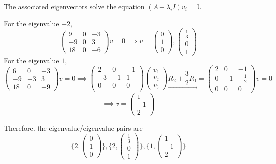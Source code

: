 \documentclass[11pt]{article}
\begin{document}
\begin{enumerate}
  The associated eigenvectors solve the equation $(A - \lambda_i I)v_i = 0$.
  
  For the eigenvalue $-2$, 
  \[\begin{pmatrix}
    9 & 0 & -3\\
    -9 & 0 & 3\\
     18 & 0 & -6
  \end{pmatrix}v = 0 \implies v = \begin{pmatrix}
    0 \\ 1 \\ 0
  \end{pmatrix}, \begin{pmatrix}
    \frac{1}{3} \\ 0 \\ 1
  \end{pmatrix}\]
  For the eigenvalue $1$, 
  \[\begin{pmatrix}
    6 & 0 & -3\\
    -9 & -3 & 3\\
    18 & 0 & -9
  \end{pmatrix}v = 0 \implies \begin{pmatrix}
    2 & 0 & -1\\
    -3 & -1 & 1\\
    0 & 0 & 0\\
  \end{pmatrix}\begin{pmatrix}
    v_1\\v_2\\v_3
  \end{pmatrix} \underset{\longrightarrow}{R_2 + \frac{3}{2}R_1} = \begin{pmatrix}
    2 & 0 & -1\\
    0 & -1 & -\frac{1}{2}\\
    0 & 0 & 0
  \end{pmatrix}v = 0\]
  \[\implies v = \begin{pmatrix}
    1 \\ -1 \\ 2
  \end{pmatrix}\]

  Therefore, the eigenvalue/eigenvalue pairs are 
  \[ \{2, \begin{pmatrix}
    0 \\ 1 \\ 0
  \end{pmatrix}\} , \{2, \begin{pmatrix}
    \frac{1}{3}\\ 0 \\ 1
  \end{pmatrix} \}, \{ 1, \begin{pmatrix}
    1 \\ -1 \\ 2
  \end{pmatrix} \}\]
\end{enumerate}
\end{document}
